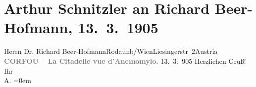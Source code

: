 

         
         \renewcommand{\erwaehntePersonen}{Personen: Richard Beer-Hofmann}
         \renewcommand{\erwaehnteOrte}{Orte: Anemomylos (Leuchtturm), Angelokastro, Korfu, Liesingerstraße, Rodaun, Wien, Österreich}
         \renewcommand{\erwaehnteWerke}{}
               \section[Arthur Schnitzler an Richard Beer-Hofmann, 13. 3. 1905]{ Arthur Schnitzler an Richard Beer-Hofmann, 13. 3. 1905}\nopagebreak{}\rehead{ }\begin{ledgroupsized}[t]{13cm}\normalsize\beginnumbering \toendnotes[C]{\smallbreak\pagebreak[2]} 
\pstart{}{\pb}Herrn Dr. Richard Beer-Hofmann\pend{}\pstart{}Rodaun\introOben{}b/Wien\introOben{}\pend{}\pstart{}Liesingerstr 2\pend{}\pstart{}Austria\pend{}{\bigskip}\pstart
           \noindent{}\centering{}{\pb}\textcolor{gray}{\textbf{CORFOU – La Citadelle vue d’Anemomylo.}}\pend
           \pstart
           \raggedleft{}13. 3. 905\pend
           \pstart
           Herzlichen Gruß!\pend
           \pstart
           Ihr{\\[\baselineskip]}\spacefill\mbox{A.}\pend
           \leftskip=0em{}
         
         \endnumbering{}\end{ledgroupsized}  \newcommand{\dateiname}{L01507}\newcommand{\titel}{Arthur Schnitzler an Richard Beer-Hofmann, 13. 3. 1905}\newcommand{\editorInnen}{Martin Anton Müller und Gerd-Hermann Susen}
      